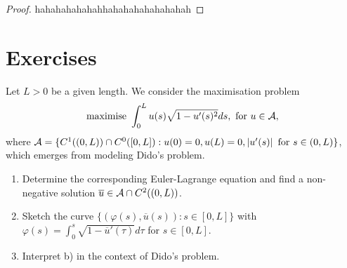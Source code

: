 \begin{proof}
  hahahahahahahhahahahahahahahah
\end{proof}










\section{Exercises}

\begin{ex}

  Let $L > 0$ be a given length. We consider the maximisation problem
  \[
    \text{maximise } \int_0^L u(s)\sqrt{1 - u'(s)^2}ds, \text{ for } u \in \mathcal{A},
  \]
  where $\mathcal{A} = \{C^1((0, L)) \cap C^0([0, L]) : u(0) = 0, u(L) = 0,
  \left\vert{u'(s)}\right\vert \text{ for } s \in (0, L)\}$, which emerges from modeling Dido's
  problem.

  \begin{enumerate}
    \item Determine the corresponding Euler-Lagrange equation and find a
      non-negative solution $\overline{u} \in \mathcal{A} \cap C^2((0, L))$.
    \item Sketch the curve $\{(\varphi(s), \overline{u}(s)) : s \in [0, L]\}$
      with $\varphi(s) = \int_0^s \sqrt{1 - \overline{u}'(\tau)}d\tau$ for $s
      \in [0, L]$.
    \item Interpret b) in the context of Dido's problem.
  \end{enumerate}
\end{ex}


